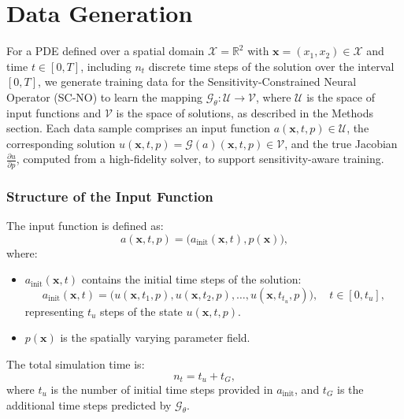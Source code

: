 \section{Data Generation}

\renewcommand{\thefigure}{B.\arabic{figure}}  %
\renewcommand{\thetable}{B.\arabic{table}}  %


For a PDE defined over a spatial domain \( \mathcal{X} = \mathbb{R}^2 \) with \( \mathbf{x} = (x_1, x_2) \in \mathcal{X} \) and time \( t \in [0, T] \), including \( n_t \) discrete time steps of the solution over the interval \( [0, T] \), we generate training data for the Sensitivity-Constrained Neural Operator (SC-NO) to learn the mapping \( \mathcal{G}_\theta: \mathcal{U} \to \mathcal{V} \), where \(\mathcal{U}\) is the space of input functions and \(\mathcal{V}\) is the space of solutions, as described in the Methods section. Each data sample comprises an input function \( a(\textbf{x}, t, p) \in \mathcal{U} \), the corresponding solution \( u(\textbf{x}, t, p) = \mathcal{G}(a)(\textbf{x}, t, p) \in \mathcal{V} \), and the true Jacobian \( \frac{\partial u}{\partial p} \), computed from a high-fidelity solver, to support sensitivity-aware training.



\subsubsection*{Structure of the Input Function}

The input function is defined as:
\begin{equation}
a(\textbf{x}, t, p) = \big( a_{\text{init}}(\textbf{x}, t), p(\textbf{x}) \big),
\end{equation}
where:
\begin{itemize}
    \item \( a_{\text{init}}(\textbf{x}, t) \) contains the initial time steps of the solution:
    \begin{equation}
    a_{\text{init}}(\textbf{x}, t) = \big( u(\textbf{x}, t_1, p), u(\textbf{x}, t_2, p), \dots, u(\textbf{x}, t_{t_u}, p) \big), \quad t \in [0, t_u],
    \end{equation}
    representing \( t_u \) steps of the state \( u(\textbf{x}, t, p) \).


    \item \( p(\textbf{x}) \) is the spatially varying parameter field.
    

\end{itemize}
The total simulation time is:
\begin{equation}
n_t = t_u + t_G,
\end{equation}
where \( t_u \) is the number of initial time steps provided in \( a_{\text{init}} \), and \( t_G \) is the additional time steps predicted by \( \mathcal{G}_\theta \).

